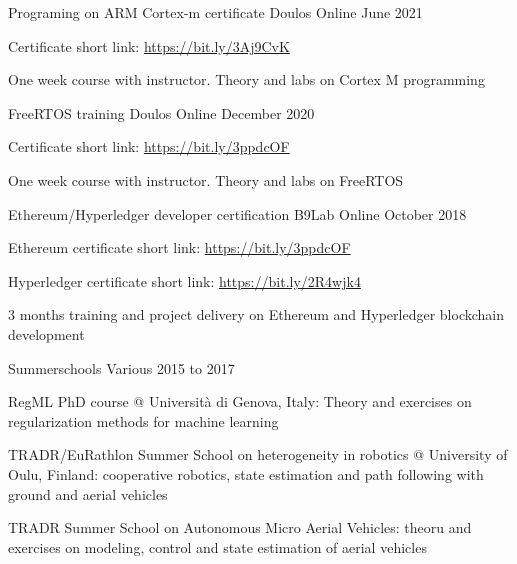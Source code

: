 \cventry
{Programing on ARM Cortex-m certificate} %
{Doulos} %
{Online} %
{June 2021} %
{
  \begin{cvitems} %
    \item{Certificate short link: \url{https://bit.ly/3Aj9CvK}}
  \end{cvitems}
  \vspace{16pt}
  \begin{cvparagraph}
    One week course with instructor. Theory and labs on Cortex M programming
  \end{cvparagraph}
  \vspace*{-25pt}
}
\cventry
{FreeRTOS training} %
{Doulos} %
{Online} %
{December 2020} %
{
  \begin{cvitems} %
    \item{Certificate short link: \url{https://bit.ly/3ppdcOF}}
  \end{cvitems}
  \vspace{16pt}
  \begin{cvparagraph}
    One week course with instructor. Theory and labs on FreeRTOS
  \end{cvparagraph}
  \vspace*{-20pt}
}
\cventry
{Ethereum/Hyperledger developer certification} %
{B9Lab} %
{Online} %
{October 2018} %
{
  \begin{cvitems} %
    \item{Ethereum certificate short link: \url{https://bit.ly/3ppdcOF}}
    \item{Hyperledger certificate short link: \url{https://bit.ly/2R4wjk4}}
  \end{cvitems}
  \vspace{16pt}
  \begin{cvparagraph}
    3 months training and project delivery on Ethereum and Hyperledger blockchain development
  \end{cvparagraph}
  \vspace*{-20pt}
}
\cventry
{Summerschools} %
{Various} %
{} %
{2015 to 2017} %
{
  \begin{cvitems} %
    \item{RegML PhD course @ Università di Genova, Italy: Theory and exercises on regularization methods for machine learning}
    \item{TRADR/EuRathlon Summer School on heterogeneity in robotics @ University of Oulu, Finland: cooperative robotics, state estimation and path following with ground and aerial vehicles}
    \item{TRADR Summer School on Autonomous Micro Aerial Vehicles: theoru and exercises on modeling, control and state estimation of aerial vehicles}
  \end{cvitems}
  \vspace*{15pt}
}
